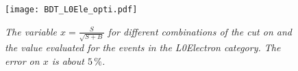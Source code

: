 %
\begin{figure}[ht]
\begin{center}
\texttt{[image: BDT\_L0Ele\_opti.pdf]}
\end{center}
\vspace*{-1cm}
\caption{\textit{The variable $x = \frac{S}{\sqrt{S+B}}$ for different combinations of the cut on \dllepi and the \bdtn value evaluated for the events in the L0Electron category. The error on $x$ is about $5\, \%$.}}
\label{fig:optiele}
\end{figure}

